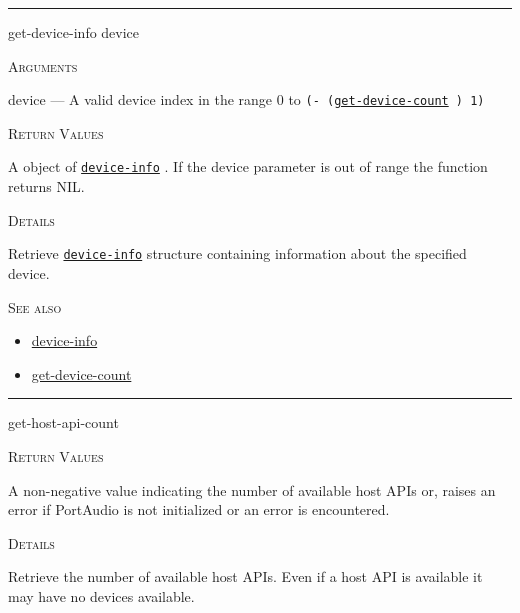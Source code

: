 \documentclass[a4paper]{report}
\begin{document}
  

    \rule{\linewidth}{0.1mm}
    
    \label{portaudio__fun__get-device-info}
    \begin{defun}[Function]
    get-device-info device


    
    \bigskip
    \textsc{Arguments}

device
	--- A valid device index in the range 0 to \texttt{(- (\hyperref[portaudio__fun__get-device-count]{\texttt{get-device-count}}
  ) 1)}




    
    \bigskip
    \textsc{Return Values}

A object of \hyperref[portaudio__class__device-info]{\texttt{device-info}}
  . If the device parameter is out of range the function returns NIL.


	
    \bigskip
    \textsc{Details}

Retrieve \hyperref[portaudio__class__device-info]{\texttt{device-info}}
   structure containing information about the specified device.






      
    \bigskip
    \textsc{See also}


	
    \begin{itemize}
    
	  
    \item
    \hyperref[portaudio__class__device-info]{device-info}
    
    \item
    \hyperref[portaudio__fun__get-device-count]{get-device-count}
    
	
    \end{itemize}
  
      


    
    \end{defun}
  
  

    \rule{\linewidth}{0.1mm}
    
    \label{portaudio__fun__get-host-api-count}
    \begin{defun}[Function]
    get-host-api-count


    
    \bigskip
    \textsc{Return Values}


A non-negative value indicating the number of available host APIs or, raises an error if PortAudio is not initialized or an error is encountered.


	
    \bigskip
    \textsc{Details}

Retrieve the number of available host APIs. Even if a host API is available it may have no devices available.


    
    \end{defun}
  
\end{document}
